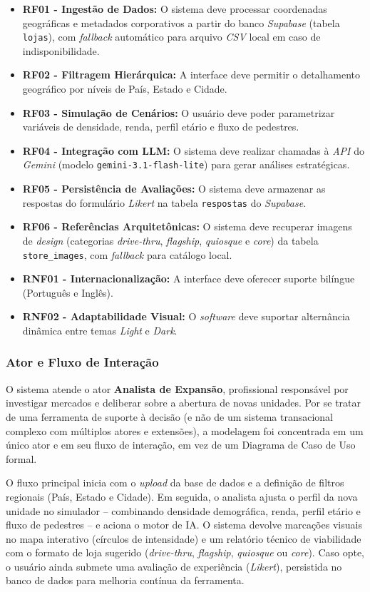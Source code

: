 \begin{itemize}
    \item \textbf{RF01 - Ingestão de Dados:} O sistema deve processar coordenadas geográficas e metadados corporativos a partir do banco \textit{Supabase} (tabela \texttt{lojas}), com \textit{fallback} automático para arquivo \textit{CSV} local em caso de indisponibilidade.
    \item \textbf{RF02 - Filtragem Hierárquica:} A interface deve permitir o detalhamento geográfico por níveis de País, Estado e Cidade.
    \item \textbf{RF03 - Simulação de Cenários:} O usuário deve poder parametrizar variáveis de densidade, renda, perfil etário e fluxo de pedestres.
    \item \textbf{RF04 - Integração com LLM:} O sistema deve realizar chamadas à \textit{API} do \textit{Gemini} (modelo \texttt{gemini-3.1-flash-lite}) para gerar análises estratégicas.
    \item \textbf{RF05 - Persistência de Avaliações:} O sistema deve armazenar as respostas do formulário \textit{Likert} na tabela \texttt{respostas} do \textit{Supabase}.
    \item \textbf{RF06 - Referências Arquitetônicas:} O sistema deve recuperar imagens de \textit{design} (categorias \textit{drive-thru}, \textit{flagship}, \textit{quiosque} e \textit{core}) da tabela \texttt{store\_images}, com \textit{fallback} para catálogo local.
    \item \textbf{RNF01 - Internacionalização:} A interface deve oferecer suporte bilíngue (Português e Inglês).
    \item \textbf{RNF02 - Adaptabilidade Visual:} O \textit{software} deve suportar alternância dinâmica entre temas \textit{Light} e \textit{Dark}.
\end{itemize}
\subsubsection{\esp Ator e Fluxo de Interação}

O sistema atende o ator \textbf{Analista de Expansão}, profissional responsável por investigar mercados e deliberar sobre a abertura de novas unidades. Por se tratar de uma ferramenta de suporte à decisão (e não de um sistema transacional complexo com múltiplos atores e extensões), a modelagem foi concentrada em um único ator e em seu fluxo de interação, em vez de um Diagrama de Caso de Uso formal.

O fluxo principal inicia com o \textit{upload} da base de dados e a definição de filtros regionais (País, Estado e Cidade). Em seguida, o analista ajusta o perfil da nova unidade no simulador -- combinando densidade demográfica, renda, perfil etário e fluxo de pedestres -- e aciona o motor de IA. O sistema devolve marcações visuais no mapa interativo (círculos de intensidade) e um relatório técnico de viabilidade com o formato de loja sugerido (\textit{drive-thru}, \textit{flagship}, \textit{quiosque} ou \textit{core}). Caso opte, o usuário ainda submete uma avaliação de experiência (\textit{Likert}), persistida no banco de dados para melhoria contínua da ferramenta.

